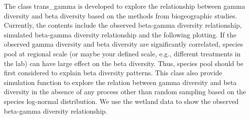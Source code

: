 \documentclass[
]{book}
\newenvironment{Shaded}{\begin{snugshade}}{\end{snugshade}}
\newcommand{\AttributeTok}[1]{\textcolor[rgb]{0.77,0.63,0.00}{#1}}
\newcommand{\CommentTok}[1]{\textcolor[rgb]{0.56,0.35,0.01}{\textit{#1}}}
\newcommand{\ConstantTok}[1]{\textcolor[rgb]{0.00,0.00,0.00}{#1}}
\newcommand{\DecValTok}[1]{\textcolor[rgb]{0.00,0.00,0.81}{#1}}
\newcommand{\FunctionTok}[1]{\textcolor[rgb]{0.00,0.00,0.00}{#1}}
\newcommand{\NormalTok}[1]{#1}
\newcommand{\OtherTok}[1]{\textcolor[rgb]{0.56,0.35,0.01}{#1}}
\newcommand{\SpecialCharTok}[1]{\textcolor[rgb]{0.00,0.00,0.00}{#1}}
\newcommand{\StringTok}[1]{\textcolor[rgb]{0.31,0.60,0.02}{#1}}
\begin{document}
The class trans\_gamma is developed to explore the relationship between gamma diversity and beta diversity
based on the methods from biogeographic studies\citep{Zhang_Local_2020}.
Currently, the contents include the observed beta-gamma diversity relationship, simulated beta-gamma diversity relationship and the following plotting.
If the observed gamma diversity and beta diversity are significantly correlated,
species pool at regional scale (or maybe your defined scale, e.g., different treatments in the lab) can have large effect on the beta diversity.
Thus, species pool should be first considered to explain beta diversity patterns.
This class also provide simulation function to explore the relation between gamma diversity and beta diversity in the absence of any process
other than random sampling based on the species log-normal distribution.
We use the wetland data to show the observed beta-gamma diversity relationship.

\begin{Shaded}
\end{Shaded}
\end{document}
